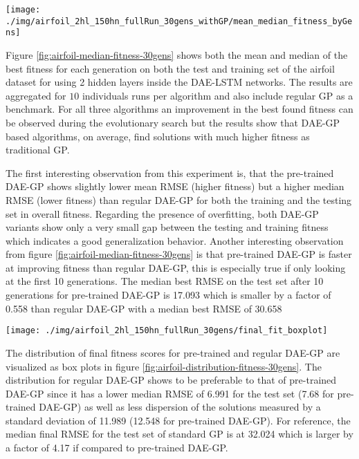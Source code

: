 \documentclass[
  11pt,
]{article}
\let\origfigure\figure
\let\endorigfigure\endfigure
\renewenvironment{figure}[1][2] {
    \expandafter\origfigure\expandafter[H]
} {
    \endorigfigure
}
\begin{document}
\begin{figure}[c]

{\centering \texttt{[image: ./img/airfoil\_2hl\_150hn\_fullRun\_30gens\_withGP/mean\_median\_fitness\_byGens]} 

}

\caption{Best Fitness over 30 Generations - Airfoil}\label{fig:airfoil-median-fitness-30gens}
\end{figure}

Figure \ref{fig:airfoil-median-fitness-30gens} shows both the mean and median of the best fitness for each generation on both the test and training set of the airfoil dataset for using 2 hidden layers inside the DAE-LSTM networks. The results are aggregated for \(10\) individuals runs per algorithm and also include regular GP as a benchmark. For all three algorithms an improvement in the best found fitness can be observed during the evolutionary search but the results show that DAE-GP based algorithms, on average, find solutions with much higher fitness as traditional GP.

The first interesting observation from this experiment is, that the pre-trained DAE-GP shows slightly lower mean RMSE (higher fitness) but a higher median RMSE (lower fitness) than regular DAE-GP for both the training and the testing set in overall fitness. Regarding the presence of overfitting, both DAE-GP variants show only a very small gap between the testing and training fitness which indicates a good generalization behavior. Another interesting observation from figure \ref{fig:airfoil-median-fitness-30gens} is that pre-trained DAE-GP is faster at improving fitness than regular DAE-GP, this is especially true if only looking at the first 10 generations. The median best RMSE on the test set after 10 generations for pre-trained DAE-GP is 17.093 which is smaller by a factor of 0.558 than regular DAE-GP with a median best RMSE of 30.658

\begin{figure}[c]

{\centering \texttt{[image: ./img/airfoil\_2hl\_150hn\_fullRun\_30gens/final\_fit\_boxplot]} 

}

\caption{Best Fitness after 30 Generations - Airfoil}\label{fig:airfoil-distribution-fitness-30gens}
\end{figure}

The distribution of final fitness scores for pre-trained and regular DAE-GP are visualized as box plots in figure \ref{fig:airfoil-distribution-fitness-30gens}. The distribution for regular DAE-GP shows to be preferable to that of pre-trained DAE-GP since it has a lower median RMSE of 6.991 for the test set (7.68 for pre-trained DAE-GP) as well as less dispersion of the solutions measured by a standard deviation of 11.989 (12.548 for pre-trained DAE-GP). For reference, the median final RMSE for the test set of standard GP is at 32.024 which is larger by a factor of 4.17 if compared to pre-trained DAE-GP.
\end{document}
